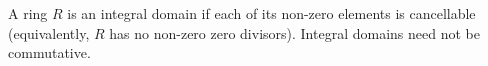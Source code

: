 A ring $R$ is an integral domain if each of its non-zero elements is cancellable (equivalently, $R$ has no non-zero zero divisors). Integral domains need not be commutative.
